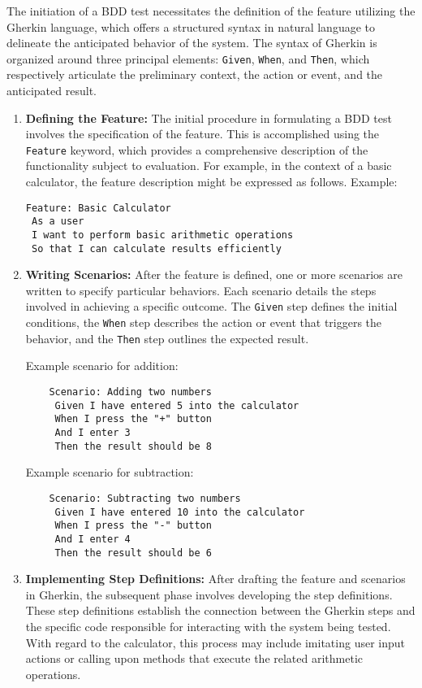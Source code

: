 The initiation of a \ac{BDD} test necessitates the definition of the feature utilizing the Gherkin language, which offers a structured syntax in natural language to delineate the anticipated behavior of the system. The syntax of Gherkin is organized around three principal elements: \texttt{Given}, \texttt{When}, and \texttt{Then}, which respectively articulate the preliminary context, the action or event, and the anticipated result.
\begin{enumerate}

\item \textbf{Defining the Feature:} The initial procedure in formulating a BDD test involves the specification of the feature. This is accomplished using the \texttt{Feature} keyword, which provides a comprehensive description of the functionality subject to evaluation. For example, in the context of a basic calculator, the feature description might be expressed as follows.
Example: \begin{verbatim}
Feature: Basic Calculator
 As a user
 I want to perform basic arithmetic operations
 So that I can calculate results efficiently
\end{verbatim}

\item \textbf{Writing Scenarios:} After the feature is defined, one or more scenarios are written to specify particular behaviors. Each scenario details the steps involved in achieving a specific outcome. The \texttt{Given} step defines the initial conditions, the \texttt{When} step describes the action or event that triggers the behavior, and the \texttt{Then} step outlines the expected result.

Example scenario for addition:
\begin{verbatim}
    Scenario: Adding two numbers
     Given I have entered 5 into the calculator
     When I press the "+" button
     And I enter 3
     Then the result should be 8
\end{verbatim}

Example scenario for subtraction:
\begin{verbatim}
    Scenario: Subtracting two numbers
     Given I have entered 10 into the calculator
     When I press the "-" button
     And I enter 4
     Then the result should be 6
\end{verbatim}

\item \textbf{Implementing Step Definitions:} After drafting the feature and scenarios in Gherkin, the subsequent phase involves developing the step definitions. These step definitions establish the connection between the Gherkin steps and the specific code responsible for interacting with the system being tested. With regard to the calculator, this process may include imitating user input actions or calling upon methods that execute the related arithmetic operations.
\end{enumerate}

